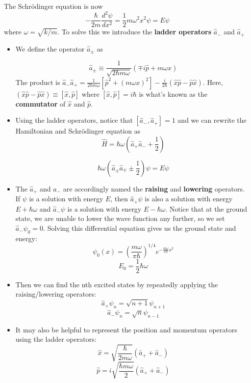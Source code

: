 \documentclass[11pt]{article}
\begin{document}
\noindent The Schr\"odinger equation is now 
\[ 
    - \frac{\hbar}{2m}\frac{d^{2}\psi}{dx^{2}} = \frac{1}{2}m\omega^{2}x^{2} \psi = E\psi 
\]
where \( \omega = \sqrt{k/m}  \). To solve this we introduce the \textbf{ladder operators} \( \hat{a}_{-} \) and \( \hat{a}_{+} \)

\begin{itemize}
    \item We define the operator \( \hat{a}_{\pm} \) as
    
    \[ 
        \hat{a}_{\pm} \equiv \frac{1}{\sqrt{2\hbar m \omega} }(\mp i \hat{p} + m\omega x)
    \]
    The product is \( \hat{a}_{-}\hat{a}_{+} = \frac{1}{2\hbar m \omega}\left[\hat{p}^{2} + (m\omega x)^{2}\right] - \frac{i}{2\hbar}(\hat{x}\hat{p} - \hat{p}\hat{x}) \). Here, 
    \(  (\hat{x}\hat{p} - \hat{p}\hat{x}) \equiv [\hat{x},\hat{p}]\) where \( [\hat{x},\hat{p}] = i\hbar \) is what's known as the \textbf{commutator} of \( \hat{x} \) and \( \hat{p} \).

    \item Using the ladder operators, notice that \( [\hat{a}_{-}, \hat{a}_{+}] = 1 \) and we can rewrite the Hamiltonian and Schr\"odinger equation as
    \[ 
        \hat{H} = \hbar \omega \left(\hat{a}_{+}\hat{a}_{-} + \frac{1}{2}\right)
    \]

    
    \[ 
        \hbar \omega \left(\hat{a}_{\pm} \hat{a}_{\mp} \pm \frac{1}{2}\right)\psi = E\psi 
    \]

    \item The \(\hat{a}_+\) and \(\hat{a}_-\) are accordingly named the \textbf{raising} and \textbf{lowering} operators. If \(\psi\) is a solution with energy \(E\), then
    \(\hat{a}_+\psi\) is also a solution with energy \(E +\hbar\omega\) and \(\hat{a}_-\psi\) is a solution with energy \(E - \hbar\omega\). Notice that at the ground state,
    we are unable to lower the wave function any further, so we set \(\hat{a}_-\psi_0 = 0\). Solving this differential equation gives us the ground state and energy:
    \[
        \psi_0(x) = \left(\frac{m\omega}{\pi\hbar}\right)^{1/4}e^{-\frac{m\omega}{\pi\hbar}x^2}
    \]
    \[
        E_0 = \frac{1}{2}\hbar\omega
    \]

    \item Then we can find the nth excited states by repeatedly applying the raising/lowering operators:
    \[
        \hat{a}_+\psi_n  = \sqrt{n+1}\psi_{n+1}
    \]
    \[
        \hat{a}_-\psi_n = \sqrt{n}\psi_{n-1}
    \]

    \item It may also be helpful to represent the position and momentum operators using the ladder operators:
    \[
        \hat{x} = \sqrt{\frac{\hbar}{2m\omega}}(\hat{a}_+ + \hat{a}_-)
    \]
    \[
        \hat{p} = i \sqrt{\frac{\hbar m \omega}{2}}(\hat{a}_+ + \hat{a}_-)
    \]    

\end{itemize}
\end{document}
